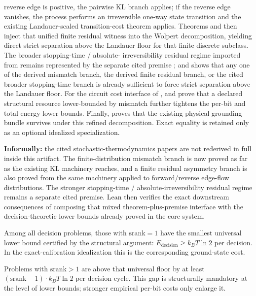 \begin{theorem}
reverse edge is positive, the pairwise KL branch applies; if the reverse edge
vanishes, the process performs an irreversible one-way state transition and the
existing Landauer-scaled transition-cost theorem applies. Theorems  and
 then inject that unified finite residual witness into the Wolpert
decomposition, yielding direct strict separation above the Landauer floor for
that finite discrete subclass. The broader stopping-time / absolute-
irreversibility residual regime imported from \cite{manzano2024absolute}
remains represented by the separate cited premise ; and  shows
that any one of the derived mismatch branch, the derived finite residual
branch, or the cited broader stopping-time branch is already sufficient to
force strict separation above the Landauer floor. For the circuit cost interface of
\cite{yadav2026minimal},  and  prove that a declared structural
resource lower-bounded by mismatch further tightens the per-bit and total energy
lower bounds. Finally,  proves that the existing physical grounding
bundle survives under this refined decomposition.
Exact equality is retained only as an optional idealized specialization.

\noindent\textbf{Informally:} the cited stochastic-thermodynamics papers are
not rederived in full inside this artifact. The finite-distribution mismatch
branch is now proved as far as the existing KL machinery reaches, and a finite
residual asymmetry branch is also proved from the same machinery applied to
forward/reverse edge-flow distributions. The stronger stopping-time /
absolute-irreversibility residual regime remains a separate cited premise. Lean
then verifies the exact downstream consequences of composing that mixed
theorem-plus-premise interface with the decision-theoretic lower bounds already
proved in the core system.
\end{theorem}

\begin{corollary}[srank $= 1$ is the Energy Ground State]\label{cor:ground-state}
Among all decision problems, those with $\mathrm{srank} = 1$ have the smallest
universal lower bound certified by the structural argument:
$E_{\mathrm{decision}} \geq k_B T \ln 2$ per decision. In the exact-calibration
idealization this is the corresponding ground-state cost.

Problems with $\mathrm{srank} > 1$ are above that universal floor by at least
$(\mathrm{srank} - 1) \cdot k_B T \ln 2$ per decision cycle. This gap is
structurally mandatory at the level of lower bounds; stronger empirical
per-bit costs only enlarge it.
\end{corollary}

